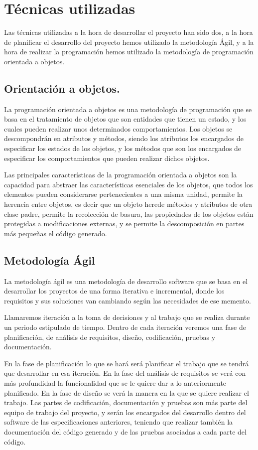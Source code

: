 \section{Técnicas utilizadas}

Las técnicas utilizadas a la hora de desarrollar el proyecto han sido dos, a la hora de planificar el desarrollo del proyecto hemos utilizado la metodología Ágil, y a la hora de realizar la programación hemos utilizado la metodología de programación orientada a objetos.

\subsection{Orientación a objetos.}
La programación orientada a objetos es una metodología de programación que se basa en el tratamiento de objetos que son entidades que tienen un estado, y los cuales pueden realizar unos determinados comportamientos.
Los objetos se descompondrán en atributos y métodos, siendo los atributos los encargados de especificar los estados de los objetos, y los métodos que son los encargados de especificar los comportamientos que pueden realizar dichos objetos.

Las principales características de la programación orientada a objetos son la capacidad para abstraer las características esenciales de los objetos, que todos los elementos pueden considerarse pertenecientes a una misma unidad, permite la herencia entre objetos, es decir que un objeto herede métodos y atributos de otra clase padre, permite la recolección de basura, las propiedades de los objetos están protegidas a modificaciones externas, y se permite la descomposición en partes más pequeñas el código generado.


\subsection{Metodología Ágil}

La metodología ágil es una metodología de desarrollo software que se basa en el desarrollar los proyectos de una forma iterativa e incremental, donde los requisitos y sus soluciones van cambiando según las necesidades de ese memento.

Llamaremos iteración a la toma de decisiones y al trabajo que se realiza durante un periodo estipulado de tiempo. Dentro de cada iteración veremos una fase de planificación, de análisis de requisitos, diseño, codificación, pruebas y documentación.

En la fase de planificación lo que se hará será planificar el trabajo que se tendrá que desarrollar en esa iteración. En la fase del análisis de requisitos se verá con más profundidad la funcionalidad que se le quiere dar a lo anteriormente planificado. En la fase de diseño se verá la manera en la que se quiere realizar el trabajo. Las partes de codificación, documentación y pruebas son más parte del equipo de trabajo del proyecto, y serán los encargados del desarrollo dentro del software de las especificaciones anteriores, teniendo que realizar también la documentación del código generado y de las pruebas asociadas a cada parte del código.



